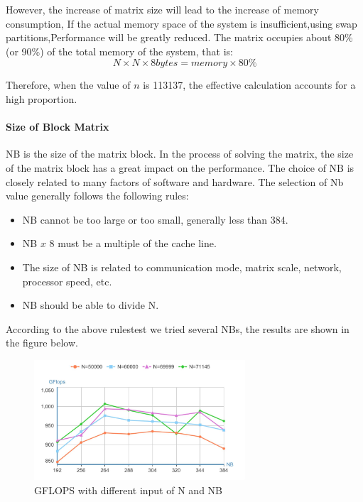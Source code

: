 \documentclass[a4paper,12pt]{article}
\begin{document}
However, the increase of matrix size will lead to the increase of memory consumption, If the actual memory space of the system is insufficient,using swap partitions,Performance will be greatly reduced. The matrix occupies about 80\% (or 90\%) of the total memory of the system, that is:
\begin{equation*}
N \times N \times 8bytes = memory \times 80\%
\end{equation*}

Therefore, when the value of \( n \) is 113137, the effective calculation accounts for a high proportion.

\paragraph{Size of Block Matrix}

NB is the size of the matrix block. In the process of solving the matrix, the size of the matrix block has a great impact on the performance. The choice of NB is closely related to many factors of software and hardware. The selection of Nb value generally follows the following rules:
\begin{itemize}
    \item NB cannot be too large or too small, generally less than 384.
    \item NB \( x \) 8 must be a multiple of the cache line.
    \item The size of NB is related to communication mode, matrix scale, network, processor speed, etc.
    \item NB should be able to divide N.
\end{itemize}

According to the above rulestest we tried several NBs, the results are shown in the figure below.

\begin{figure}[H]
    \centering
    \includegraphics[width=0.7\textwidth]{GFLOPS_NB.png}
    \caption{GFLOPS with different input of N and NB}
    \label{fig:gflops_nb}
\end{figure}
\end{document}
